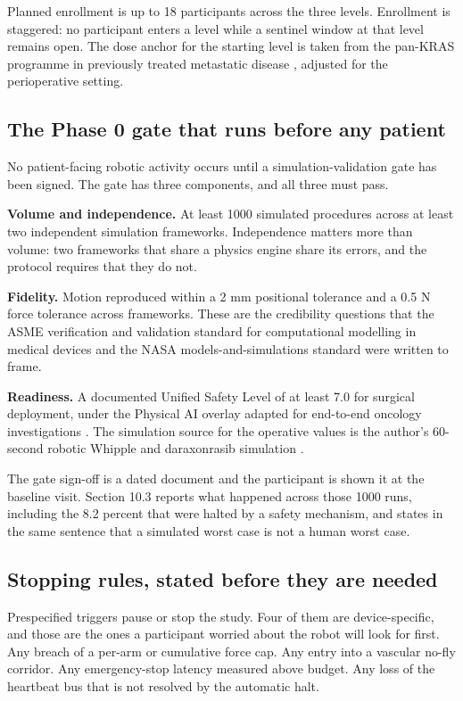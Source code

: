 \noindent Planned enrollment is up to 18 participants across the three levels.
Enrollment is staggered: no participant enters a level while a sentinel window
at that level remains open. The dose anchor for the starting level is taken from
the pan-KRAS programme in previously treated metastatic disease
\cite{rasolute302, oreilly2026darax}, adjusted for the perioperative setting.

\subsection{The Phase 0 gate that runs before any patient}

No patient-facing robotic activity occurs until a simulation-validation gate has
been signed. The gate has three components, and all three must pass.

\textbf{Volume and independence.} At least 1000 simulated procedures across at
least two independent simulation frameworks. Independence matters more than
volume: two frameworks that share a physics engine share its errors, and the
protocol requires that they do not.

\textbf{Fidelity.} Motion reproduced within a 2 mm positional tolerance and a
0.5 N force tolerance across frameworks. These are the credibility questions
that the ASME verification and validation standard for computational modelling
in medical devices \cite{asmevv40} and the NASA models-and-simulations standard
\cite{nasastd7009} were written to frame.

\textbf{Readiness.} A documented Unified Safety Level of at least 7.0 for
surgical deployment, under the Physical AI overlay adapted for end-to-end
oncology investigations \cite{cfr312paiuni}. The simulation source for the
operative values is the author's 60-second robotic Whipple and daraxonrasib
simulation \cite{pdac060s2030}.

The gate sign-off is a dated document and the participant is shown it at the
baseline visit. Section 10.3 reports what happened across those 1000 runs,
including the 8.2 percent that were halted by a safety mechanism, and states in
the same sentence that a simulated worst case is not a human worst case.

\subsection{Stopping rules, stated before they are needed}

Prespecified triggers pause or stop the study. Four of them are device-specific,
and those are the ones a participant worried about the robot will look for
first. Any breach of a per-arm or cumulative force cap. Any entry into a
vascular no-fly corridor. Any emergency-stop latency measured above budget. Any
loss of the heartbeat bus that is not resolved by the automatic halt.

